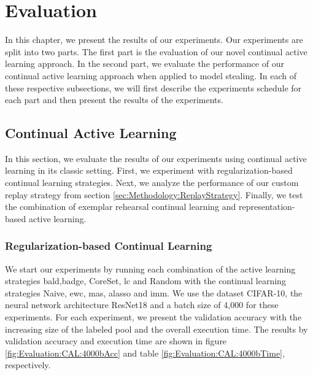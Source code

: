 
\chapter{Evaluation}
\label{ch:Evaluation}

In this chapter, we present the results of our experiments. Our experiments are split into two parts. The first part is the evaluation of our novel
continual active learning approach. In the second part, we evaluate the performance of our continual active learning approach when applied to model stealing.
In each of these respective subsections, we will first describe the experiments schedule for each part and then present the results of the experiments.



\section{Continual Active Learning}
\label{sec:CAL}
In this section, we evaluate the results of our experiments using continual active learning in its classic setting. First, we experiment with regularization-based
continual learning strategies. Next, we analyze the performance of our custom replay strategy from section \ref{sec:Methodology:ReplayStrategy}. Finally, we
test the combination of exemplar rehearsal continual learning and representation-based active learning.

\subsection{Regularization-based Continual Learning}
\label{sec:Evaluation:CAL:ALRegCL}
We start our experiments by running each combination of the active learning strategies \gls{bald},\gls{badge}, CoreSet, \gls{lc} and Random with the continual learning
strategies Naive, \gls{ewc}, \gls{mas}, \gls{alasso} and \gls{imm}. We use the dataset CIFAR-10, the neural network architecture ResNet18 and a batch size of 4,000 for
these experiments. For each experiment, we present the validation accuracy with the increasing size of the labeled pool and the overall execution time.
The results by validation accuracy and execution time are shown in figure \ref{fig:Evaluation:CAL:4000bAcc} and table \ref{fig:Evaluation:CAL:4000bTime}, respectively.\par

